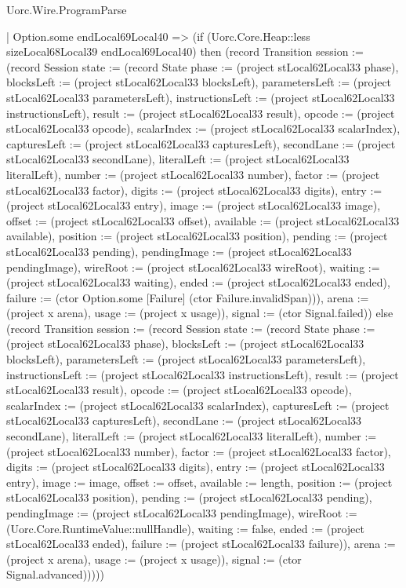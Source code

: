 \begin{lexlean}{Uorc.Wire.ProgramParse}
\begin{semanticmodule}
{            | Option.some endLocal69Local40 => (if (Uorc.Core.Heap::less sizeLocal68Local39 endLocal69Local40) then (record Transition {session := (record Session {state := (record State {phase := (project stLocal62Local33 phase), blocksLeft := (project stLocal62Local33 blocksLeft), parametersLeft := (project stLocal62Local33 parametersLeft), instructionsLeft := (project stLocal62Local33 instructionsLeft), result := (project stLocal62Local33 result), opcode := (project stLocal62Local33 opcode), scalarIndex := (project stLocal62Local33 scalarIndex), capturesLeft := (project stLocal62Local33 capturesLeft), secondLane := (project stLocal62Local33 secondLane), literalLeft := (project stLocal62Local33 literalLeft), number := (project stLocal62Local33 number), factor := (project stLocal62Local33 factor), digits := (project stLocal62Local33 digits), entry := (project stLocal62Local33 entry), image := (project stLocal62Local33 image), offset := (project stLocal62Local33 offset), available := (project stLocal62Local33 available), position := (project stLocal62Local33 position), pending := (project stLocal62Local33 pending), pendingImage := (project stLocal62Local33 pendingImage), wireRoot := (project stLocal62Local33 wireRoot), waiting := (project stLocal62Local33 waiting), ended := (project stLocal62Local33 ended), failure := (ctor Option.some [Failure] (ctor Failure.invalidSpan))}), arena := (project x arena), usage := (project x usage)}), signal := (ctor Signal.failed)}) else (record Transition {session := (record Session {state := (record State {phase := (project stLocal62Local33 phase), blocksLeft := (project stLocal62Local33 blocksLeft), parametersLeft := (project stLocal62Local33 parametersLeft), instructionsLeft := (project stLocal62Local33 instructionsLeft), result := (project stLocal62Local33 result), opcode := (project stLocal62Local33 opcode), scalarIndex := (project stLocal62Local33 scalarIndex), capturesLeft := (project stLocal62Local33 capturesLeft), secondLane := (project stLocal62Local33 secondLane), literalLeft := (project stLocal62Local33 literalLeft), number := (project stLocal62Local33 number), factor := (project stLocal62Local33 factor), digits := (project stLocal62Local33 digits), entry := (project stLocal62Local33 entry), image := image, offset := offset, available := length, position := (project stLocal62Local33 position), pending := (project stLocal62Local33 pending), pendingImage := (project stLocal62Local33 pendingImage), wireRoot := (Uorc.Core.RuntimeValue::nullHandle), waiting := false, ended := (project stLocal62Local33 ended), failure := (project stLocal62Local33 failure)}), arena := (project x arena), usage := (project x usage)}), signal := (ctor Signal.advanced)}))))
}
\end{semanticmodule}
\end{lexlean}
